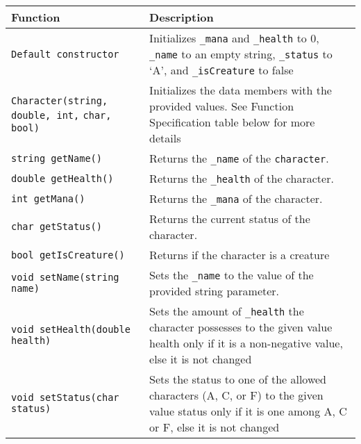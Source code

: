 \renewcommand{\arraystretch}{1.5} 
\begin{longtable}{|p{2.0in}|p{4.0in}|}
\hline
\textbf{Function} & \textbf{Description} \\ \hline

\texttt{Default constructor} & Initializes \texttt{_mana} and \texttt{_health} to 0, \texttt{_name} to an empty string, \texttt{_status} to `A', and \texttt{_isCreature} to false \\ \hline

\texttt{Character(string, double, int,} \newline \texttt{char, bool)} & Initializes the data members with the provided values.
See Function Specification table below for more details \\ \hline

\texttt{string getName()} & Returns the \texttt{_name} of the \texttt{character}. \\ \hline

\texttt{double getHealth()} & Returns the \texttt{_health} of the character. \\ \hline

\texttt{int getMana()} & Returns the \texttt{_mana} of the character. \\ \hline

\texttt{char getStatus()} & Returns the current status of the character. \\ \hline

\texttt{bool getIsCreature()} & Returns if the character is a creature\\ \hline

\texttt{void setName(string name)} & Sets the \texttt{_name} to the value of the provided string parameter. \\ \hline

\texttt{void setHealth(double health)} & Sets the amount of \texttt{_health} the character possesses to the given value health only if it is a non-negative value, else it is not changed \\ \hline

\texttt{void setStatus(char status)} & Sets the status to one of the allowed characters (A, C, or F) to the given value status only if it is one among A, C or F, else it is not changed \\ \hline


\end{longtable}
